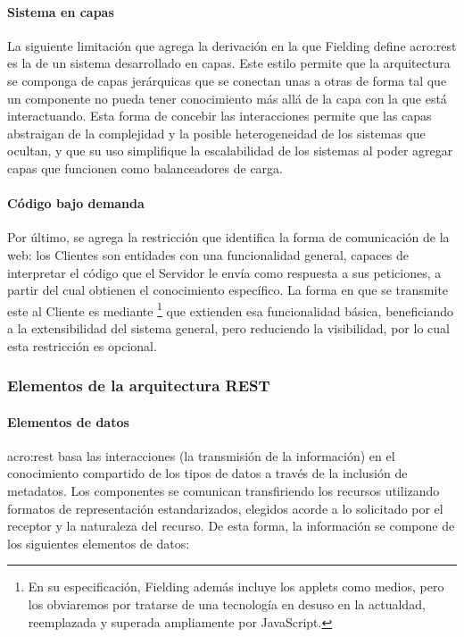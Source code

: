 \paragraph{Sistema en capas}

La siguiente limitación que agrega la derivación en la que Fielding define \gls{acro:rest} es la de un sistema desarrollado en capas. Este estilo permite que la arquitectura se componga de capas jerárquicas que se conectan unas a otras de forma tal que un componente no pueda tener conocimiento más allá de la capa con la que está interactuando. Esta forma de concebir las interacciones permite que las capas abstraigan de la complejidad y la posible heterogeneidad de los sistemas que ocultan, y que su uso simplifique la escalabilidad de los sistemas al poder agregar capas que funcionen como balanceadores de carga.


\paragraph{Código bajo demanda}

Por último, se agrega la restricción que identifica la forma de comunicación de la web: los Clientes son entidades con una funcionalidad general, capaces de interpretar el código que el Servidor le envía como respuesta a sus peticiones, a partir del cual obtienen el conocimiento específico. La forma en que se transmite este  al Cliente es mediante \footnote{En su especificación, Fielding además incluye los applets como medios, pero los obviaremos por tratarse de una tecnología en desuso en la actualdad, reemplazada y superada ampliamente por JavaScript.} que extienden esa funcionalidad básica, beneficiando a la extensibilidad del sistema general, pero reduciendo la visibilidad, por lo cual esta restricción es opcional.


\subsubsection{Elementos de la arquitectura REST}
\label{standard:rest:elementos}

\paragraph{Elementos de datos}

\gls{acro:rest} basa las interacciones (la transmisión de la información) en el conocimiento compartido de los tipos de datos a través de la inclusión de metadatos. Los componentes se comunican transfiriendo los recursos utilizando formatos de representación estandarizados, elegidos acorde a lo solicitado por el receptor y la naturaleza del recurso. De esta forma, la información se compone de los siguientes elementos de datos:

